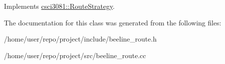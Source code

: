 Implements \hyperlink{classcsci3081_1_1RouteStrategy_a4bf67b185a4446324ebc13c1cda40cfe}{csci3081\+::\+Route\+Strategy}.



The documentation for this class was generated from the following files\+:\begin{DoxyCompactItemize}
\item 
/home/user/repo/project/include/beeline\+\_\+route.\+h\item 
/home/user/repo/project/src/beeline\+\_\+route.\+cc\end{DoxyCompactItemize}
